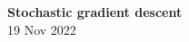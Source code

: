 \onehalfspacing


\begin{center}
  \Large{\textbf{Stochastic gradient descent}}\\
  19 Nov 2022
\end{center}



